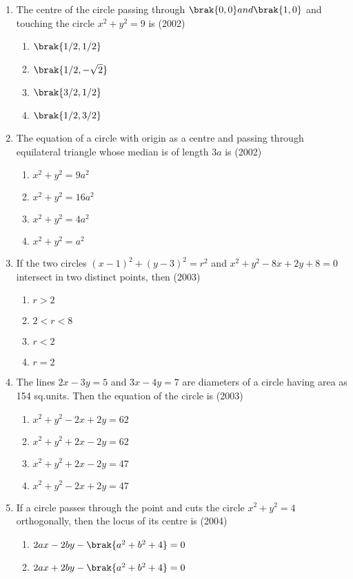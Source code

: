 \begin{enumerate}
\item The centre of the circle passing through $\brak{0,0} and \brak{1,0}$ and touching the circle $x^2+y^2=9$ is \hfill(2002)
\begin{enumerate}
\item$\brak{1/2,1/2}$
\item$\brak{1/2,-\sqrt{2}}$
\item$\brak{3/2,1/2}$
\item$\brak{1/2,3/2}$
\end{enumerate}
\item The equation of a circle with origin as a centre and passing through equilateral triangle whose median is of length $3a$ is \hfill(2002)
\begin{enumerate}
\item$x^2+y^2=9a^2$
\item$x^2+y^2=16a^2$
\item$x^2+y^2=4a^2$
\item$x^2+y^2=a^2$
\end{enumerate}
\item If the two circles $(x-1)^2+(y-3)^2=r^2$ and $x^2+y^2-8x+2y+8=0$ intersect in two distinct points, then \hfill(2003)
\begin{enumerate}
\item$r>2$
\item$2<r<8$
\item$r<2$
\item$r=2$
\end{enumerate}
\item The lines $2x-3y=5$ and $3x-4y=7$ are diameters of a circle having area as 154 sq.units. Then the equation of the circle is
\hfill{(2003)}
\begin{enumerate}
\item $x^2+y^2-2x+2y=62$
\item $x^2+y^2+2x-2y=62$
\item $x^2+y^2+2x-2y=47$
\item $x^2+y^2-2x+2y=47$
\end{enumerate}
\item If a circle passes through the point  and cuts the circle $x^2+y^2=4$ orthogonally, then the locus of its centre is
\hfill{(2004)}
\begin{enumerate}
\item $2ax-2by-\brak{a^2+b^2+4}=0$
\item $2ax+2by-\brak{a^2+b^2+4}=0$

\end{enumerate}
\end{enumerate}
